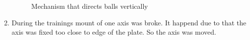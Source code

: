 \begin{enumerate}
\begin{figure}[H]
\begin{minipage}[h]{0.31\linewidth}
			\end{minipage}
			\hfill
			\begin{minipage}[h]{0.31\linewidth}
			\end{minipage}
			\caption{Mechanism that directs balls vertically}
		\end{figure}
	
	\item During the trainings mount of one axis was broke. It happend due to that the axis was fixed too close to edge of the plate. So the axis was moved.
	

\end{enumerate}

